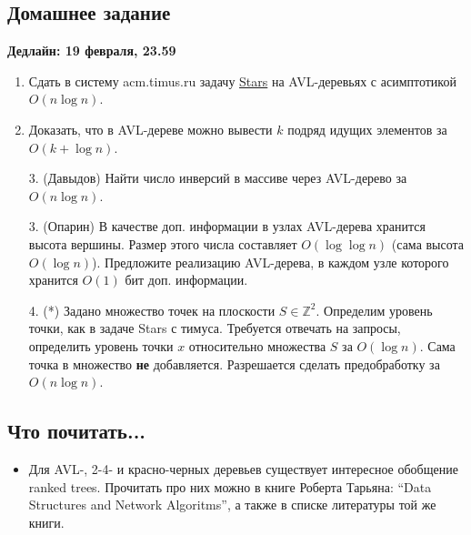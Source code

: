 \subsection{Домашнее задание}
\textbf{Дедлайн: 19 февраля, 23.59}

\begin{enumerate}

  \item Сдать в систему acm.timus.ru задачу
\href{http://acm.timus.ru/problem.aspx?space=1&num=1028}{Stars}
на AVL-деревьях с асимптотикой $O(n \log n)$.

  \item Доказать, что в AVL-дереве можно вывести $k$ подряд идущих элементов за
$O(k + \log n)$.

  \item[3.] (Давыдов) Найти число инверсий в массиве через AVL-дерево за $O(n \log n)$.

  \item[3.] (Опарин) В качестве доп. информации в узлах AVL-дерева хранится
высота вершины. Размер этого числа составляет $O(\log \log n)$ (сама высота
$O(\log n)$). Предложите реализацию AVL-дерева, в каждом узле которого
хранится $O(1)$ бит доп. информации.

  \item[4.] (*) Задано множество точек на плоскости $S \in \mathbb{Z}^2$.
Определим уровень точки, как в задаче Stars с тимуса.  Требуется отвечать на
запросы, определить уровень точки $x$ относительно множества $S$ за $O(\log n)$.
Сама точка в множество \textbf{не} добавляется. Разрешается сделать 
предобработку за $O(n \log n)$.

\end{enumerate}

\subsection{Что почитать...}

\begin{itemize}
  
  \item Для AVL-, 2-4- и красно-черных деревьев существует интересное обобщение
ranked trees. Прочитать про них можно в книге Роберта Тарьяна: ``Data Structures
and Network Algoritms'', а также в списке литературы той же книги.

\end{itemize}

\clearpage

